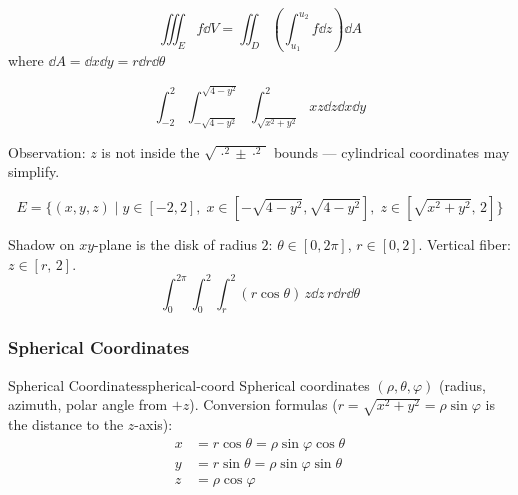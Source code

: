 \[
  \iiint_E f\dd{V}
  = \iint_D\!\left(\int_{u_1}^{u_2} f\dd{z}\right)\dd{A}
\]
where $\dd{A} = \dd{x}\dd{y} = r\dd{r}\dd{\theta}$

\begin{example}
  \[
    \int_{-2}^{2}\!\int_{-\sqrt{4-y^2}}^{\sqrt{4-y^2}}\!\int_{\sqrt{x^2+y^2}}^{2} xz\dd{z}\dd{x}\dd{y}
  \]

  Observation: $z$ is not inside the $\sqrt{\,\cdot^2 \pm \cdot^2\,}$ bounds --- cylindrical coordinates may simplify.

  \[
    E = \{(x,y,z) \mid y\in[-2,2],\; x\in[-\sqrt{4-y^2},\sqrt{4-y^2}],\; z\in[\sqrt{x^2+y^2},\,2]\}
  \]

  \begin{center}
  \end{center}

  Shadow on $xy$-plane is the disk of radius $2$: $\theta\in[0,2\pi]$, $r\in[0,2]$. Vertical fiber: $z\in[r,\,2]$.
  \[
    \int_0^{2\pi}\!\int_0^{2}\!\int_r^{2} (r\cos\theta)\,z\dd{z}\,r\dd{r}\dd{\theta}
  \]
\end{example}

\subsubsection{Spherical Coordinates}

\begin{definition}{Spherical Coordinates}{spherical-coord}
  Spherical coordinates $(\rho, \theta, \varphi)$ (radius, azimuth, polar angle from $+z$). Conversion formulas ($r = \sqrt{x^2+y^2} = \rho\sin\varphi$ is the distance to the $z$-axis):
  \begin{align*}
    x & = r\cos\theta = \rho\sin\varphi\cos\theta \\
    y & = r\sin\theta = \rho\sin\varphi\sin\theta \\
    z & = \rho\cos\varphi
  \end{align*}
\end{definition}

